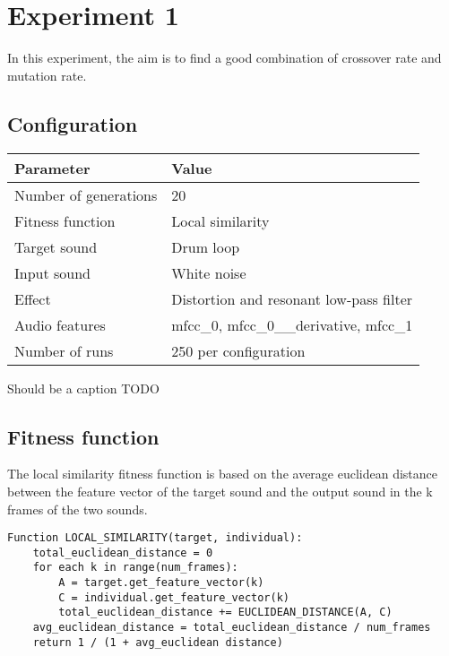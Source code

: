 \section{Experiment 1}
In this experiment, the aim is to find a good combination of crossover rate and mutation rate.

\subsection{Configuration}
\begin{minipage}{\linewidth}
\centering
{} \label{tab:title} 
\begin{tabular}{ C{3.5in} C{1.6in} }\toprule[1.5pt]
\bf Parameter & \bf Value \\
\midrule
  Number of generations & 20 \\
\midrule
  Fitness function & Local similarity \\
\midrule
  Target sound & Drum loop \\
\midrule
  Input sound & White noise \\
\midrule
  Effect & Distortion and resonant low-pass filter \\
\midrule
  Audio features & mfcc\_0, mfcc\_0\_\_derivative, mfcc\_1 \\
\midrule
  Number of runs & 250 per configuration \\
\bottomrule[1.25pt]
\end {tabular}\par
\bigskip
Should be a caption TODO
\end{minipage}

\subsection{Fitness function}
The local similarity fitness function is based on the average euclidean distance between the feature vector of the target sound and the output sound in the k frames of the two sounds.

\begin{verbatim}
Function LOCAL_SIMILARITY(target, individual):
    total_euclidean_distance = 0
    for each k in range(num_frames):
        A = target.get_feature_vector(k)
        C = individual.get_feature_vector(k)
        total_euclidean_distance += EUCLIDEAN_DISTANCE(A, C)
    avg_euclidean_distance = total_euclidean_distance / num_frames
    return 1 / (1 + avg_euclidean distance)
\end{verbatim}

